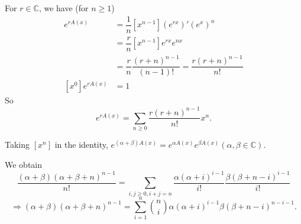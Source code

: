 \begin{theorem}
For $r\in \mathbb{C}$, we have (for $n\geq 1$)
\begin{align*}
[x^n]e^{rA(x)} &= \dfrac{1}{n}[x^{n-1}](e^{rx})'(e^x)^n\\
&=\dfrac{r}{n}[x^{n-1}]e^{rx}e^{nx}\\
&=\dfrac{r}{n}\dfrac{(r+n)^{n-1}}{(n-1)!}=\dfrac{r(r+n)^{n-1}}{n!}\\
[x^0]e^{rA(x)}&=1
\end{align*}
So $$e^{rA(x)}=\sum_{n\geq 0}\dfrac{r(r+n)^{n-1}}{n!}x^n.$$

Taking $[x^n]$ in the identity,
$e^{(\alpha +\beta)A(x)}=e^{\alpha A(x)}e^{\beta A(x)}(\alpha , \beta \in \mathbb{C}).$

We obtain
$$\dfrac{(\alpha+\beta)(\alpha+\beta+n)^{n-1}}{n!}=\sum\limits_{i,j\geq 0, i+j=n} \dfrac{\alpha(\alpha+i)^{i-1}}{i!}\dfrac{\beta(\beta+n-i)^{i-1}}{i!}$$
$$\Rightarrow (\alpha+\beta)(\alpha+\beta+n)^{n-1}=\sum\limits_{i=1}^n{\binom{n}{i}} \alpha (\alpha+i)^{i-1} \beta (\beta+n-i)^{n-i-1}.$$

\end{theorem}

